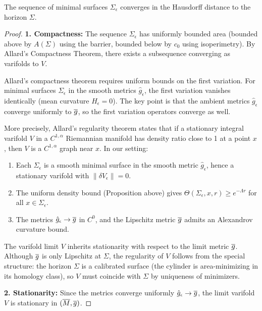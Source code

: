 \begin{theorem}
The sequence of minimal surfaces $\Sigma_\epsilon$ converges in the Hausdorff distance to the horizon $\Sigma$.
\end{theorem}
\begin{proof}
\textbf{1. Compactness:} The sequence $\Sigma_\epsilon$ has uniformly bounded area (bounded above by $A(\Sigma)$ using the barrier, bounded below by $c_0$ using isoperimetry). By Allard's Compactness Theorem, there exists a subsequence converging as varifolds to $V$.

\begin{remark}\label{rem:AllardApplicability}
Allard's compactness theorem requires uniform bounds on the first variation. For minimal surfaces $\Sigma_\epsilon$ in the smooth metrics $\hat{g}_\epsilon$, the first variation vanishes identically (mean curvature $H_\epsilon = 0$). The key point is that the ambient metrics $\hat{g}_\epsilon$ converge uniformly to $\overline{g}$, so the first variation operators converge as well.

More precisely, Allard's regularity theorem \cite[Theorem 8.19]{simon1983} states that if a stationary integral varifold $V$ in a $C^{1,\alpha}$ Riemannian manifold has density ratio close to 1 at a point $x$, then $V$ is a $C^{1,\alpha}$ graph near $x$. In our setting:
\begin{enumerate}
    \item[(i)] Each $\Sigma_\epsilon$ is a smooth minimal surface in the smooth metric $\hat{g}_\epsilon$, hence a stationary varifold with $\|\delta V_\epsilon\| = 0$.
    \item[(ii)] The uniform density bound (Proposition above) gives $\Theta(\Sigma_\epsilon, x, r) \ge e^{-\Lambda r}$ for all $x \in \Sigma_\epsilon$.
    \item[(iii)] The metrics $\hat{g}_\epsilon \to \overline{g}$ in $C^0$, and the Lipschitz metric $\overline{g}$ admits an Alexandrov curvature bound.
\end{enumerate}
The varifold limit $V$ inherits stationarity with respect to the limit metric $\overline{g}$. Although $\overline{g}$ is only Lipschitz at $\Sigma$, the regularity of $V$ follows from the special structure: the horizon $\Sigma$ is a calibrated surface (the cylinder is area-minimizing in its homology class), so $V$ must coincide with $\Sigma$ by uniqueness of minimizers.
\end{remark}

\textbf{2. Stationarity:} Since the metrics converge uniformly $\hat{g}_\epsilon \to \overline{g}$, the limit varifold $V$ is stationary in $(\overline{M}, \overline{g})$.


\end{proof}
